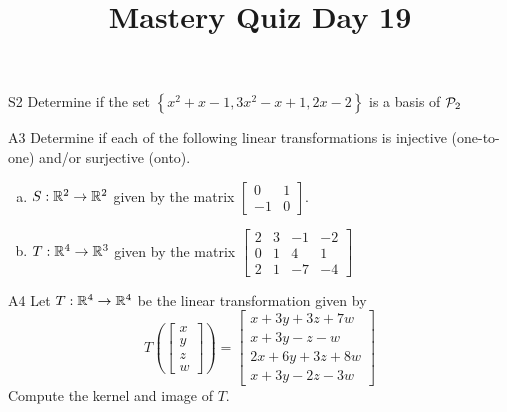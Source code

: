 \documentclass{sbgLAquiz}
\title{Mastery Quiz Day 19 }
\begin{document}
\begin{problem}{S2}
Determine if the set $\left\{ x^2+x-1, 3x^2-x+1, 2x-2 \right\}$ is a basis of $\P_2$
\end{problem}

\begin{problem}{A3}
Determine if each of the following linear transformations is injective (one-to-one) and/or surjective (onto).
\begin{enumerate}[(a)]
\item $S: \IR^2 \rightarrow \IR^2$ given by the matrix $\begin{bmatrix} 0 & 1 \\ -1 & 0 \end{bmatrix}$.
\item $T: \IR^4 \rightarrow \IR^3$ given by the matrix $\begin{bmatrix} 2 & 3 & -1 & -2 \\ 0 & 1 & 4 & 1 \\ 2 & 1 & -7 & -4 \end{bmatrix}$
\end{enumerate}
\end{problem}
\newpage

\begin{problem}{A4}
Let $T: \IR^4\rightarrow \IR^4$ be the linear transformation given by $$T\left(\begin{bmatrix} x \\ y \\ z \\ w \end{bmatrix} \right) = \begin{bmatrix} x+3y+3z+7w \\ x+3y-z-w \\ 2x+6y+3z+8w \\ x+3y-2z-3w \end{bmatrix}$$
Compute the kernel and image of $T$.
\end{problem}
\end{document}
